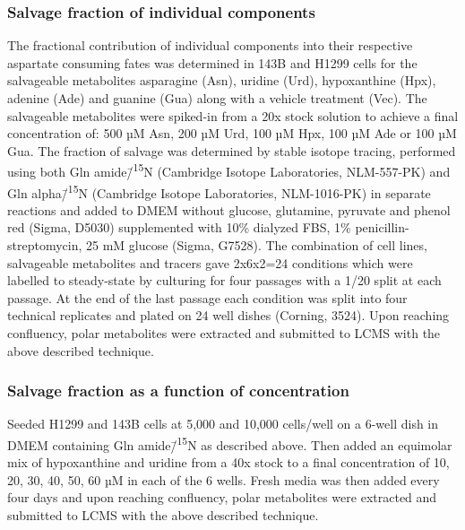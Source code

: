 \subsubsection{Salvage fraction of individual components}
The fractional contribution of individual components into their respective aspartate consuming fates was determined in 143B and H1299 cells for the salvageable metabolites asparagine (Asn), uridine (Urd), hypoxanthine (Hpx), adenine (Ade) and guanine (Gua) along with a vehicle treatment (Vec).
The salvageable metabolites were spiked-in from a 20x stock solution to achieve a final concentration of: 500 µM Asn, 200 µM Urd, 100 µM Hpx, 100 µM Ade or 100 µM Gua.
The fraction of salvage was determined by stable isotope tracing, performed using both Gln amide\=/\textsuperscript{15}N (Cambridge Isotope Laboratories, NLM-557-PK) and Gln alpha\=/\textsuperscript{15}N (Cambridge Isotope Laboratories, NLM-1016-PK) in separate reactions and added to DMEM without glucose, glutamine, pyruvate and phenol red (Sigma, D5030) supplemented with 10\% dialyzed FBS, 1\% penicillin-streptomycin, 25 mM glucose (Sigma, G7528).
The combination of cell lines, salvageable metabolites and tracers gave 2x6x2=24 conditions which were labelled to steady-state by culturing for four passages with a 1/20 split at each passage.
At the end of the last passage each condition was split into four technical replicates and plated on 24 well dishes (Corning, 3524).
Upon reaching confluency, polar metabolites were extracted and submitted to LCMS with the above described technique.

\subsubsection{Salvage fraction as a function of concentration}
Seeded H1299 and 143B cells at 5,000 and 10,000 cells/well on a 6-well dish in DMEM containing Gln amide\=/\textsuperscript{15}N as described above.
Then added an equimolar mix of hypoxanthine and uridine from a 40x stock to a final concentration of 10, 20, 30, 40, 50, 60 µM in each of the 6 wells.
Fresh media was then added every four days and upon reaching confluency, polar metabolites were extracted and submitted to LCMS with the above described technique.








